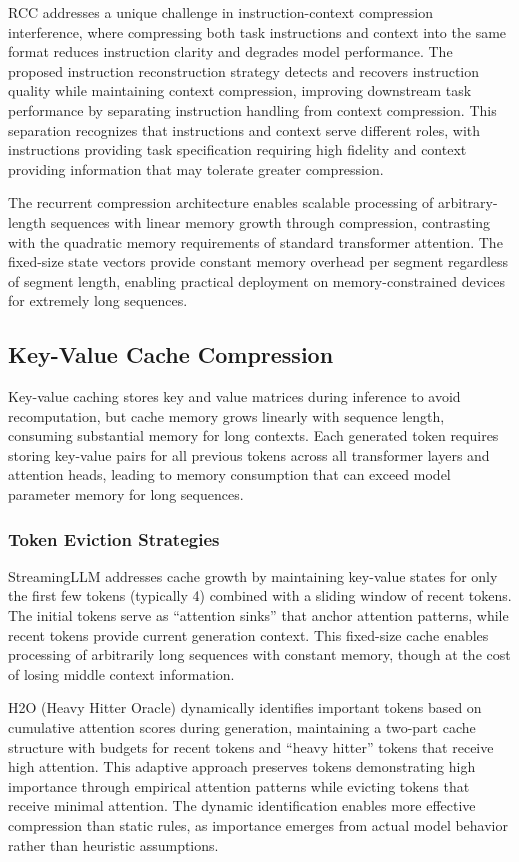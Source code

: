 \documentclass[11pt,letterpaper]{article}
\begin{document}
RCC addresses a unique challenge in instruction-context compression interference, where compressing both task instructions and context into the same format reduces instruction clarity and degrades model performance. The proposed instruction reconstruction strategy detects and recovers instruction quality while maintaining context compression, improving downstream task performance by separating instruction handling from context compression. This separation recognizes that instructions and context serve different roles, with instructions providing task specification requiring high fidelity and context providing information that may tolerate greater compression.

The recurrent compression architecture enables scalable processing of arbitrary-length sequences with linear memory growth through compression, contrasting with the quadratic memory requirements of standard transformer attention. The fixed-size state vectors provide constant memory overhead per segment regardless of segment length, enabling practical deployment on memory-constrained devices for extremely long sequences.

\subsection{Key-Value Cache Compression}

Key-value caching stores key and value matrices during inference to avoid recomputation, but cache memory grows linearly with sequence length, consuming substantial memory for long contexts. Each generated token requires storing key-value pairs for all previous tokens across all transformer layers and attention heads, leading to memory consumption that can exceed model parameter memory for long sequences.

\subsubsection{Token Eviction Strategies}

StreamingLLM addresses cache growth by maintaining key-value states for only the first few tokens (typically 4) combined with a sliding window of recent tokens. The initial tokens serve as ``attention sinks'' that anchor attention patterns, while recent tokens provide current generation context. This fixed-size cache enables processing of arbitrarily long sequences with constant memory, though at the cost of losing middle context information.

H2O (Heavy Hitter Oracle) dynamically identifies important tokens based on cumulative attention scores during generation, maintaining a two-part cache structure with budgets for recent tokens and ``heavy hitter'' tokens that receive high attention. This adaptive approach preserves tokens demonstrating high importance through empirical attention patterns while evicting tokens that receive minimal attention. The dynamic identification enables more effective compression than static rules, as importance emerges from actual model behavior rather than heuristic assumptions.
\end{document}

